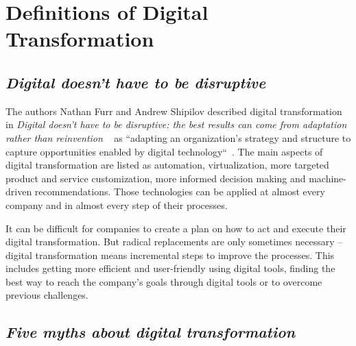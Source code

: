 \documentclass[a4]{scrartcl}
\begin{document}
	\section{Definitions of Digital Transformation} \label{sec:Sec1}







	\subsection{\textit{Digital doesn't have to be disruptive}} \label{disruptive}
	
	The authors Nathan Furr and Andrew Shipilov described digital transformation in \textit{Digital doesn't have to be disruptive: the best results can come from adaptation rather than reinvention }~\cite{disruptive} as ``adapting an organization's strategy and structure to capture opportunities enabled by digital technology``~\cite[p. 96]{disruptive}.
	The main aspects of digital transformation are listed as automation, virtualization, more targeted product and service customization, more informed decision making and machine-driven recommendations. Those technologies can be applied at almost every company and in almost every step of their processes.~\cite{disruptive}
	
	It can be difficult for companies to create a plan on how to act and execute their digital transformation. But radical replacements are only sometimes necessary -- digital transformation means incremental steps to improve the processes. This includes getting more efficient and user-friendly using digital tools, finding the best way to reach the company's goals through digital tools or to overcome previous challenges.~\cite{disruptive}
	









\subsection{\textit{Five myths about digital transformation}} \label{5myths}	
	
\end{document}
